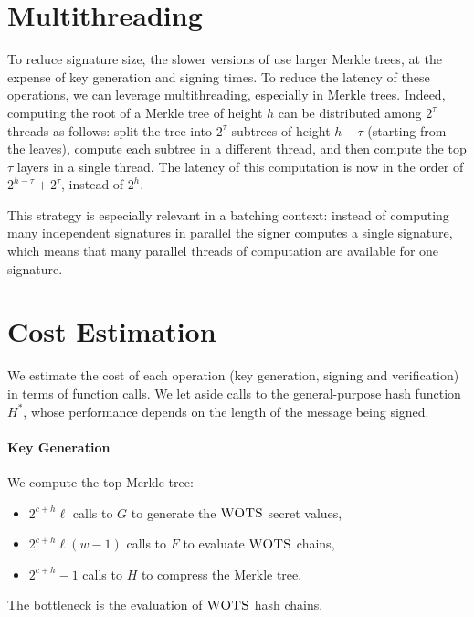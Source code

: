 \section{Multithreading}

To reduce signature size, the slower versions of \gravity{} use larger Merkle trees, at the expense of key generation and signing times.
To reduce the latency of these operations, we can leverage multithreading, especially in Merkle trees.
Indeed, computing the root of a Merkle tree of height $h$ can be distributed among $2^\tau$ threads as follows: split the tree into $2^\tau$ subtrees of height $h-\tau$ (starting from the leaves), compute each subtree in a different thread, and then compute the top $\tau$ layers in a single thread.
The latency of this computation is now in the order of $2^{h-\tau} + 2^\tau$, instead of $2^h$.

This strategy is especially relevant in a batching context: instead of computing many independent signatures in parallel the signer computes a single signature, which means that many parallel threads of computation are available for one signature.


\section{Cost Estimation}\label{sec:cost}

We estimate the cost of each operation (key generation, signing and verification) in terms of function calls.
We let aside calls to the general-purpose hash function $H^*$, whose performance depends on the length of the message being signed.

\paragraph{Key Generation}
We compute the top Merkle tree:
\begin{itemize}
\item $2^{c+h} \ell$ calls to $G$ to generate the $\textsc{WOTS}$ secret values,
\item $2^{c+h} \ell (w-1)$ calls to $F$ to evaluate $\textsc{WOTS}$ chains,
\item $2^{c+h}-1$ calls to $H$ to compress the Merkle tree.
\end{itemize}
The bottleneck is the evaluation of $\textsc{WOTS}$ hash chains.

